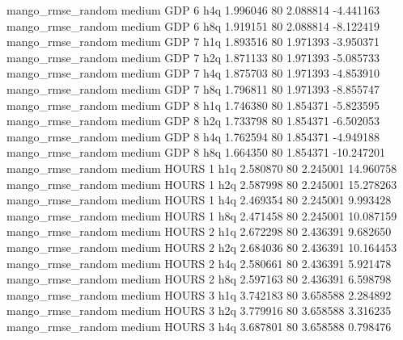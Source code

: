 mango_rmse_random     medium      GDP                 6                  h4q  1.996046 80       2.088814          -4.441163
mango_rmse_random     medium      GDP                 6                  h8q  1.919151 80       2.088814          -8.122419
mango_rmse_random     medium      GDP                 7                  h1q  1.893516 80       1.971393          -3.950371
mango_rmse_random     medium      GDP                 7                  h2q  1.871133 80       1.971393          -5.085733
mango_rmse_random     medium      GDP                 7                  h4q  1.875703 80       1.971393          -4.853910
mango_rmse_random     medium      GDP                 7                  h8q  1.796811 80       1.971393          -8.855747
mango_rmse_random     medium      GDP                 8                  h1q  1.746380 80       1.854371          -5.823595
mango_rmse_random     medium      GDP                 8                  h2q  1.733798 80       1.854371          -6.502053
mango_rmse_random     medium      GDP                 8                  h4q  1.762594 80       1.854371          -4.949188
mango_rmse_random     medium      GDP                 8                  h8q  1.664350 80       1.854371         -10.247201
mango_rmse_random     medium    HOURS                 1                  h1q  2.580870 80       2.245001          14.960758
mango_rmse_random     medium    HOURS                 1                  h2q  2.587998 80       2.245001          15.278263
mango_rmse_random     medium    HOURS                 1                  h4q  2.469354 80       2.245001           9.993428
mango_rmse_random     medium    HOURS                 1                  h8q  2.471458 80       2.245001          10.087159
mango_rmse_random     medium    HOURS                 2                  h1q  2.672298 80       2.436391           9.682650
mango_rmse_random     medium    HOURS                 2                  h2q  2.684036 80       2.436391          10.164453
mango_rmse_random     medium    HOURS                 2                  h4q  2.580661 80       2.436391           5.921478
mango_rmse_random     medium    HOURS                 2                  h8q  2.597163 80       2.436391           6.598798
mango_rmse_random     medium    HOURS                 3                  h1q  3.742183 80       3.658588           2.284892
mango_rmse_random     medium    HOURS                 3                  h2q  3.779916 80       3.658588           3.316235
mango_rmse_random     medium    HOURS                 3                  h4q  3.687801 80       3.658588           0.798476
